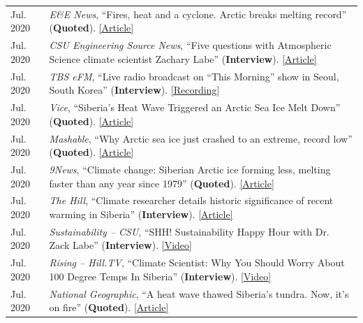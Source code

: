\documentclass[margin,line,palatino,courier,10pt]{res}
\begin{document}
\begin{resume}
\begin{tabular}{@{}p{0.9in}p{4in}}
Jul. 2020 & \textit{E\&E News}, ``Fires, heat and a cyclone. Arctic breaks melting record'' (\textbf{Quoted}). \href{https://www.eenews.net/stories/1063658765}{[Article]}\\
Jul. 2020 & \textit{CSU Engineering Source News}, ``Five questions with Atmospheric Science climate scientist Zachary Labe'' (\textbf{Interview}). \href{https://engr.source.colostate.edu/five-questions-with-climate-scientist-zachary-labe/}{[Article]}\\
Jul. 2020 & \textit{TBS eFM}, ``Live radio broadcast on “This Morning” show in Seoul, South Korea'' (\textbf{Interview}). \href{https://podcasts.apple.com/kr/podcast/0724-in-focus-1-effects-human-induced-climate-change/id1038822609?i=1000485914634&l=en}{[Recording]}\\
Jul. 2020 & \textit{Vice}, ``Siberia's Heat Wave Triggered an Arctic Sea Ice Melt Down'' (\textbf{Quoted}). \href{https://www.vice.com/en_us/article/ep45be/siberias-heat-wave-triggered-an-arctic-sea-ice-melt-down}{[Article]}\\
Jul. 2020 & \textit{Mashable}, ``Why Arctic sea ice just crashed to an extreme, record low'' (\textbf{Quoted}). \href{https://mashable.com/article/arctic-sea-ice-plummets-2020/}{[Article]}\\
Jul. 2020 & \textit{9News}, ``Climate change: Siberian Arctic ice forming less, melting faster than any year since 1979'' (\textbf{Quoted}). \href{https://www.9news.com.au/world/climate-change-global-warming-siberian-heatwave-arctic-ice-melting-faster-us-research-data/}{[Article]}\\
Jul. 2020 & \textit{The Hill}, ``Climate researcher details historic significance of recent warming in Siberia'' (\textbf{Interview}). \href{https://thehill.com/hilltv/rising/507850-climate-researcher-details-historic-significance-of-recent-warming-in-siberia}{[Article]}\\
Jul. 2020 & \textit{Sustainability -- CSU}, ``SHH! Sustainability Happy Hour with Dr. Zack Labe'' (\textbf{Interview}). \href{https://www.youtube.com/watch?v=E6htTPoeXQ8&feature=youtu.be}{[Video]}\\
Jul. 2020 & \textit{Rising -- Hill.TV}, ``Climate Scientist: Why You Should Worry About 100 Degree Temps In Siberia'' (\textbf{Interview}). \href{https://www.youtube.com/watch?v=fw4fG-_aI28&feature=youtu.be}{[Video]}\\
Jul. 2020 & \textit{National Geographic}, ``A heat wave thawed Siberia’s tundra. Now, it’s on fire'' (\textbf{Quoted}). \href{https://www.nationalgeographic.com/science/2020/07/heat-wave-thawed-siberia-now-on-fire/#close}{[Article]}\\

\end{tabular}
\end{resume}
\end{document}
